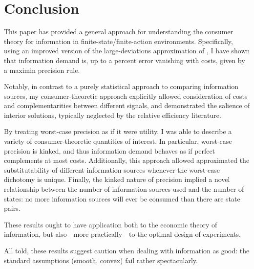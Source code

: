 \documentclass{fancyArticle}
\renewcommand{\|}{\,|\,}                    %
\providecommand{\;}{\,;}                    %
\begin{document}

\section{Conclusion}
\label{sec:conclusion}

This paper has provided a general approach for understanding the consumer theory for information in finite-state/finite-action environments.
Specifically, using an improved version of the large-deviations approximation of \cite{Moscarini2002}, I have shown that information demand is, up to a percent error vanishing with costs, given by a maximin precision rule.

Notably, in contrast to a purely statistical approach to comparing information sources, my consumer-theoretic approach explicitly allowed consideration of costs and complementarities between different signals, and demonstrated the salience of interior solutions, typically neglected by the relative efficiency literature.

By treating worst-case precision as if it were utility, I was able to describe a variety of consumer-theoretic quantities of interest.
In particular, worst-case precision is kinked, and thus information demand behaves as if perfect complements at most costs.
Additionally, this approach allowed approximated the substitutability of different information sources whenever the worst-case dichotomy is unique.
Finally, the kinked nature of precision implied a novel relationship between the number of information sources used and the number of states: no more information sources will ever be consumed than there are state pairs.

These results ought to have application both to the economic theory of information, but also---more practically---to the optimal design of experiments.

All told, these results suggest caution when dealing with information as good: the standard assumptions (smooth, convex) fail rather spectacularly.
\end{document}
